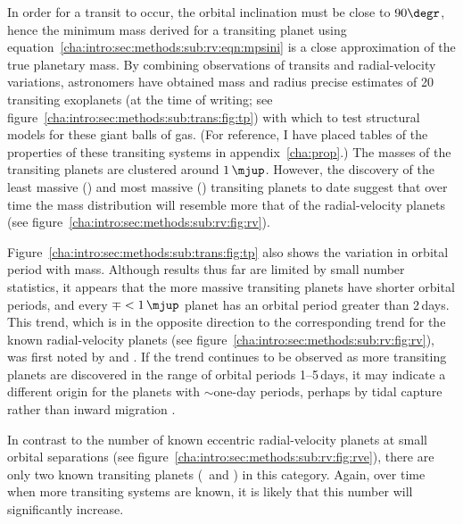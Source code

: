 In order for a transit to occur, the orbital inclination must be close to $90\degr$, hence the minimum mass derived for a transiting planet using equation~\ref{cha:intro:sec:methods:sub:rv:eqn:mpsini} is a close approximation of the true planetary mass. 
By combining observations of transits and radial-velocity variations, astronomers have obtained mass and radius precise estimates of 20 transiting exoplanets (at the time of writing; see figure~\ref{cha:intro:sec:methods:sub:trans:fig:tp}) with which to test structural models for these giant balls of gas. 
(For reference, I have placed tables of the properties of these transiting systems in appendix~\ref{cha:prop}.)
The masses of the transiting planets are clustered around $1\,\mjup$. 
However, the discovery of the least massive (\gjFTSb) and most massive (\hatptwob) transiting planets to date suggest that over time the mass distribution will resemble more that of the radial-velocity planets (see figure~\ref{cha:intro:sec:methods:sub:rv:fig:rv}).

Figure~\ref{cha:intro:sec:methods:sub:trans:fig:tp} also shows the variation in orbital period with mass. 
Although results thus far are limited by small number statistics, it appears that the more massive transiting planets have shorter orbital periods, and every $\mp<1\,\mjup$ planet has an orbital period greater than 2\,days. 
This trend, which is in the opposite direction to the corresponding trend for the known radial-velocity planets (see figure~\ref{cha:intro:sec:methods:sub:rv:fig:rv}), was first noted by \citet*{Mazeh_Zucker_Pont:mnras:2005a} and \citet*{Gaudi_Seager_Mallen-Ornelas:apj:2005a}.
If the trend continues to be observed as more transiting planets are discovered in the range of orbital periods 1--5\,days, it may indicate a different origin for the planets with $\sim$one-day periods, perhaps by tidal capture rather than inward migration \citep{Gaudi_Winn:apj:2007a}. 

In contrast to the number of known eccentric radial-velocity planets at small orbital separations (see figure~\ref{cha:intro:sec:methods:sub:rv:fig:rve}), there are only two known transiting planets (\gjFTSb\ and \hatptwob) in this category.
Again, over time when more transiting systems are known, it is likely that this number will significantly increase. 

